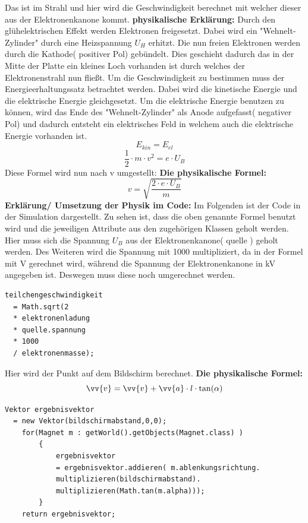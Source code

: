 Das ist im Strahl und hier wird die Geschwindigkeit berechnet mit welcher dieser aus der Elektronenkanone kommt. 
\newline \textbf{physikalische Erklärung:}
\newline Durch den glühelektrischen Effekt werden Elektronen freigesetzt. Dabei wird ein "Wehnelt-Zylinder" durch eine Heizspannung $U_H$ erhitzt. Die nun freien Elektronen werden durch die Kathode( positiver Pol) gebündelt. Dies geschieht dadurch das in der Mitte der Platte ein kleines Loch vorhanden ist durch welches der Elektronenstrahl nun fließt. Um die Geschwindigkeit zu bestimmen muss der Energieerhaltungssatz betrachtet werden. Dabei wird die kinetische Energie und die elektrische Energie gleichgesetzt. Um die elektrische Energie benutzen zu können, wird das Ende des "Wehnelt-Zylinder" als Anode aufgefasst( negativer Pol) und dadurch entsteht ein elektrisches Feld in welchem auch die elektrische Energie vorhanden ist. 
$$ E_{kin} = E_{el}$$
$$ \frac{1}{2} \cdot m \cdot v^2 = e \cdot U_B$$
Diese Formel wird  nun nach v umgestellt:
\newline \textbf{Die physikalische Formel:}
$$ v = \sqrt{\frac{2 \cdot e \cdot U_B}{m}}$$
\newline \textbf{Erklärung/ Umsetzung der Physik im Code:}
\newline Im Folgenden ist der Code in der Simulation dargestellt. Zu sehen ist, dass die oben genannte Formel benutzt wird und die jeweiligen Attribute aus den zugehörigen Klassen geholt werden. Hier muss sich die Spannung $U_B$ aus der Elektronenkanone( quelle ) geholt werden. Des Weiteren wird die Spannung mit 1000 multipliziert, da in der Formel mit V gerechnet wird, während die Spannung der Elektronenkanone in kV angegeben ist. Deswegen muss diese noch umgerechnet werden.
\begin{lstlisting}
teilchengeschwindigkeit 
  = Math.sqrt(2 
  * elektronenladung 
  * quelle.spannung 
  * 1000 
  / elektronenmasse);
\end{lstlisting}

Hier wird der Punkt auf dem Bildschirm berechnet.
\newline \textbf{Die physikalische Formel:}
$$ \vv{v} = \vv{v} + \vv{a} \cdot l \cdot \tan(\alpha)$$
\begin{lstlisting}
Vektor ergebnisvektor 
  = new Vektor(bildschirmabstand,0,0);
    for(Magnet m : getWorld().getObjects(Magnet.class) )
        {
            ergebnisvektor 
            = ergebnisvektor.addieren( m.ablenkungsrichtung.
            multiplizieren(bildschirmabstand).
            multiplizieren(Math.tan(m.alpha)));
        }
    return ergebnisvektor;
\end{lstlisting}
 
